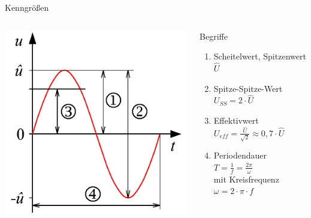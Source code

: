 \begin{frame}{Kenngrößen}
  \begin{columns}[c]
      \includegraphics[width=\textwidth,height=\textheight,keepaspectratio]{a11/Sinusspannung.pdf}
      {\tiny \hyperlink{refs}{\cite{wm}}}
      \begin{block}{Begriffe}
    \begin{enumerate}
          \item Scheitelwert, Spitzenwert $\hat{U}$
          \item Spitze-Spitze-Wert $U_{SS} = 2 \cdot \hat{U}$
          \item Effektivwert $U_{eff} = \frac{\hat{U}}{\sqrt{2}} \approx 0,7 \cdot \hat{U}$
          \item Periodendauer $T = \frac{1}{f} = \frac{2\pi}{\omega}$\\
            mit Kreisfrequenz $\omega = 2\cdot\pi \cdot f$
    \end{enumerate}
      \end{block}
  \end{columns}
\end{frame}

